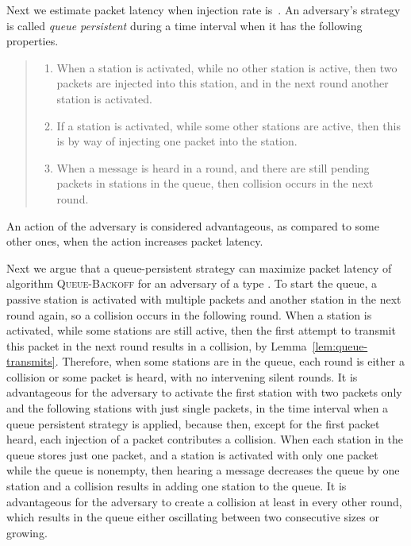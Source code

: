 \documentclass[11pt]{article}
\begin{document}
Next we estimate packet latency when injection rate is~.
An adversary's strategy is called \emph{queue persistent}  during a time interval  when it has the following properties.
\begin{quote}
\begin{enumerate}
\item
When a station is activated, while no other station is active, then two packets are injected into this station, and in the next round another station is activated.
\item
If a station is activated, while some other stations are active, then this is by way of injecting one packet into the station.
\item
When a message is heard in a round, and there are still pending packets in stations in the queue,  then collision occurs in the next round.
\end{enumerate}
\end{quote}
An action of the adversary is considered advantageous, as compared to some other ones, when the action increases packet latency. 

Next we argue that a queue-persistent strategy can maximize packet latency of algorithm \textsc{Queue-Backoff} for an adversary of a type . 
To start the queue, a passive station is activated with multiple packets and another station in the next round again, so a collision occurs in the following round.
When a station is activated, while some stations are still active, then the first attempt to transmit this packet in the next round results in a collision, by Lemma~\ref{lem:queue-transmits}.
Therefore, when some stations are in the queue, each round is either a collision or some packet is heard, with no intervening silent rounds.
It is advantageous for the adversary to activate the first station with two packets only and the following stations with just single packets, in the time interval when a queue persistent strategy is applied, because then, except for the first packet heard, each injection of a packet contributes a collision.
When each station in the queue stores just one packet, and a station is activated with only one packet while the queue is nonempty, then hearing a message decreases the queue by one station and a collision results in adding one station to the queue. 
It is advantageous for the adversary to  create a collision at least in every other round, which results in the queue either oscillating between two consecutive sizes or growing.
\end{document}
